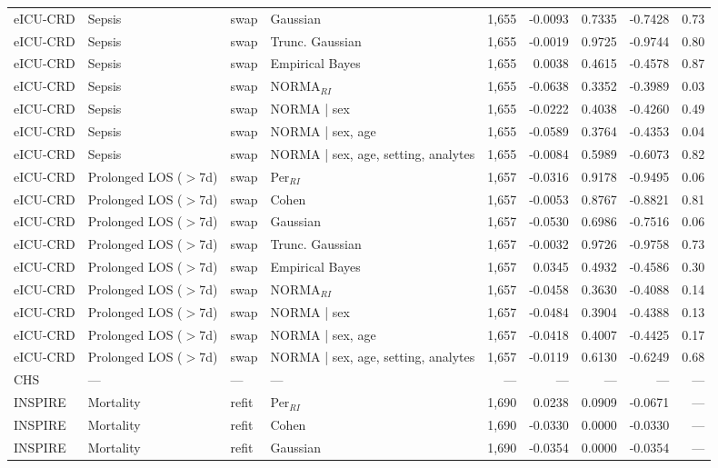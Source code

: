 \begin{table}[ht]
\begin{tabular}{ll l l r r r r r}
eICU-CRD & Sepsis & swap & Gaussian & 1,655 & -0.0093 & 0.7335 & -0.7428 & 0.73 \\
eICU-CRD & Sepsis & swap & Trunc. Gaussian & 1,655 & -0.0019 & 0.9725 & -0.9744 & 0.80 \\
eICU-CRD & Sepsis & swap & Empirical Bayes & 1,655 & 0.0038 & 0.4615 & -0.4578 & 0.87 \\
eICU-CRD & Sepsis & swap & NORMA$_{RI}$ & 1,655 & -0.0638 & 0.3352 & -0.3989 & 0.03 \\
eICU-CRD & Sepsis & swap & NORMA | sex & 1,655 & -0.0222 & 0.4038 & -0.4260 & 0.49 \\
eICU-CRD & Sepsis & swap & NORMA | sex, age & 1,655 & -0.0589 & 0.3764 & -0.4353 & 0.04 \\
eICU-CRD & Sepsis & swap & NORMA | sex, age, setting, analytes & 1,655 & -0.0084 & 0.5989 & -0.6073 & 0.82 \\
eICU-CRD & Prolonged LOS ($>$7d) & swap & Per$_{RI}$ & 1,657 & -0.0316 & 0.9178 & -0.9495 & 0.06 \\
eICU-CRD & Prolonged LOS ($>$7d) & swap & Cohen & 1,657 & -0.0053 & 0.8767 & -0.8821 & 0.81 \\
eICU-CRD & Prolonged LOS ($>$7d) & swap & Gaussian & 1,657 & -0.0530 & 0.6986 & -0.7516 & 0.06 \\
eICU-CRD & Prolonged LOS ($>$7d) & swap & Trunc. Gaussian & 1,657 & -0.0032 & 0.9726 & -0.9758 & 0.73 \\
eICU-CRD & Prolonged LOS ($>$7d) & swap & Empirical Bayes & 1,657 & 0.0345 & 0.4932 & -0.4586 & 0.30 \\
eICU-CRD & Prolonged LOS ($>$7d) & swap & NORMA$_{RI}$ & 1,657 & -0.0458 & 0.3630 & -0.4088 & 0.14 \\
eICU-CRD & Prolonged LOS ($>$7d) & swap & NORMA | sex & 1,657 & -0.0484 & 0.3904 & -0.4388 & 0.13 \\
eICU-CRD & Prolonged LOS ($>$7d) & swap & NORMA | sex, age & 1,657 & -0.0418 & 0.4007 & -0.4425 & 0.17 \\
eICU-CRD & Prolonged LOS ($>$7d) & swap & NORMA | sex, age, setting, analytes & 1,657 & -0.0119 & 0.6130 & -0.6249 & 0.68 \\
CHS & --- & --- & --- & --- & --- & --- & --- & --- \\
INSPIRE & Mortality & refit & Per$_{RI}$ & 1,690 & 0.0238 & 0.0909 & -0.0671 & --- \\
INSPIRE & Mortality & refit & Cohen & 1,690 & -0.0330 & 0.0000 & -0.0330 & --- \\
INSPIRE & Mortality & refit & Gaussian & 1,690 & -0.0354 & 0.0000 & -0.0354 & --- \\

\end{tabular}
\end{table}
